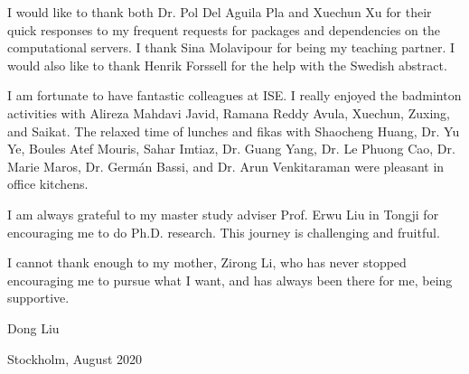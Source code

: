 I would like to thank both Dr. Pol Del Aguila Pla and Xuechun Xu for their quick responses to my frequent requests for packages and dependencies on the computational servers. I thank Sina Molavipour for being my teaching partner. I would also like to thank Henrik Forssell for the help with the Swedish abstract.


I am fortunate to have fantastic colleagues at ISE. I really enjoyed the badminton activities with Alireza Mahdavi Javid, Ramana Reddy Avula, Xuechun, Zuxing, and Saikat. The relaxed time of lunches and fikas with Shaocheng Huang, Dr. Yu Ye, Boules Atef Mouris, Sahar Imtiaz, Dr. Guang Yang, Dr. Le Phuong Cao, Dr. Marie Maros, Dr. Germ\'{a}n Bassi, and Dr. Arun Venkitaraman were pleasant in office kitchens.

I am always grateful to my master study adviser Prof. Erwu Liu in Tongji for encouraging me to do Ph.D. research. This journey is challenging and fruitful.

I cannot thank enough to my mother, Zirong Li, who has never stopped encouraging me to pursue what I want, and has always been there for me, being supportive. \newline
\newline


\hfill
Dong Liu

\hfill
Stockholm, August 2020





